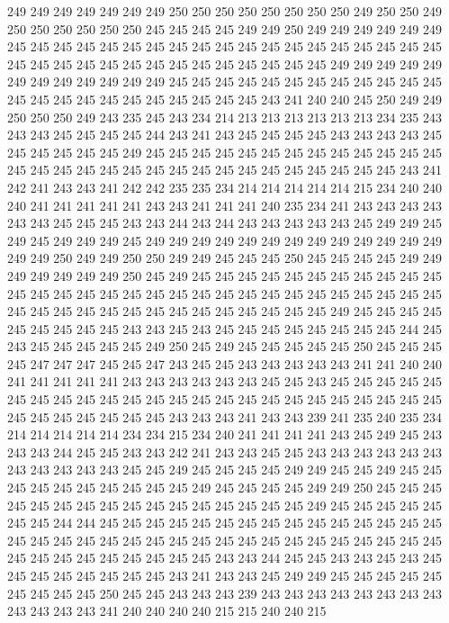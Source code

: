 249 249 249 249 249 249 249 250 250 250 250 250 250 250 250 249 250 250 249 250
250 250 250 250 250 245 245 245 245 249 249 250 249 249 249 249 249 249 245 245
245 245 245 245 245 245 245 245 245 245 245 245 245 245 245 245 245 245 245 245
245 245 245 245 245 245 245 245 245 245 245 249 249 249 249 249 249 249 249 249
249 249 249 245 245 245 245 245 245 245 245 245 245 245 245 245 245 245 245 245
245 245 245 245 245 245 243 241 240 240 245 250 249 249 250 250 250 249 243 235
245 243 234 214 213 213 213 213 213 213 234 235 243 243 243 245 245 245 245 244
243 241 243 245 245 245 245 243 243 243 243 245 245 245 245 245 245 249 245 245
245 245 245 245 245 245 245 245 245 245 245 245 245 245 245 245 245 245 245 245
245 245 245 245 245 245 245 245 243 241 242 241 243 243 241 242 242 235 235 234
214 214 214 214 214 215 234 240 240 240 241 241 241 241 241 243 243 241 241 241
240 235 234 241 243 243 243 243 243 243 245 245 245 243 243 244 243 244 243 243
243 243 243 245 249 249 245 249 245 249 249 249 245 249 249 249 249 249 249 249
249 249 249 249 249 249 249 249 250 249 249 250 250 249 249 245 245 245 250 245
245 245 245 249 249 249 249 249 249 249 250 245 249 245 245 245 245 245 245 245
245 245 245 245 245 245 245 245 245 245 245 245 245 245 245 245 245 245 245 245
245 245 245 245 245 245 245 245 245 245 245 245 245 245 245 245 245 249 245 245
245 245 245 245 245 245 245 243 243 245 243 245 245 245 245 245 245 245 245 244
245 243 245 245 245 245 245 249 250 245 249 245 245 245 245 245 250 245 245 245
245 247 247 247 245 245 247 243 245 245 243 243 243 243 243 241 241 240 240 241
241 241 241 241 243 243 243 243 243 243 245 245 243 245 245 245 245 245 245 245
245 245 245 245 245 245 245 245 245 245 245 245 245 245 245 245 245 245 245 245
245 245 245 245 243 243 243 241 243 243 239 241 235 240 235 234 214 214 214 214
214 234 234 215 234 240 241 241 241 241 243 245 249 245 243 243 243 244 245 245
243 243 242 241 243 243 245 245 243 243 243 243 243 243 243 243 243 243 243 245
245 249 245 245 245 245 249 249 245 245 249 245 245 245 245 245 245 245 245 245
245 249 245 245 245 245 249 249 250 245 245 245 245 245 245 245 245 245 245 245
245 245 245 245 245 249 245 245 245 245 245 245 245 244 244 245 245 245 245 245
245 245 245 245 245 245 245 245 245 245 245 245 245 245 245 245 245 245 245 245
245 245 245 245 245 245 245 245 245 245 245 245 245 245 245 245 245 245 243 243
244 245 245 243 243 245 243 245 245 245 245 245 245 245 245 243 241 243 243 245
249 249 245 245 245 245 245 245 245 245 245 250 245 245 243 243 243 239 243 243
243 243 243 243 243 243 243 243 243 243 241 240 240 240 240 215 215 240 240 215
